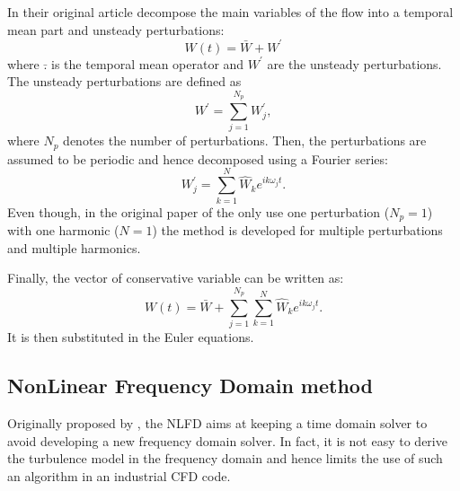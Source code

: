 In their original article \citet{He1998} decompose
the main variables of the flow into a temporal mean
part and unsteady perturbations:
\begin{equation}
	W(t) = \bar{W} + W^\prime
	\label{eq:nlh_decompose}
\end{equation}
where $\bar{.}$ is the temporal mean operator and
$W^\prime$ are the unsteady perturbations.
The unsteady perturbations are defined as
\begin{equation}
	W^\prime = \sum_{j=1}^{N_p} W^\prime_j,
	\label{eq:nlh_w_prime}
\end{equation}
where $N_p$ denotes the number of perturbations.
Then, the perturbations are assumed to be periodic and hence
decomposed using a Fourier series:
\begin{equation}
	W^\prime_j = \sum_{k=1}^{N} \widehat{W}_k e ^{i k \omega_j t}.
	\label{eq:nlh_fourier}
\end{equation}
Even though, in the original paper of \citet{He1998} the only use one 
perturbation ($N_p=1$) with one harmonic ($N=1$) the method
is developed for multiple perturbations and multiple harmonics.

Finally, the vector of conservative variable can be written as:
\begin{equation}
	W(t) = \bar{W} + \sum_{j=1}^{N_p} \sum_{k=1}^{N} \widehat{W}_k e ^{i k \omega_j t}.
\end{equation}
It is then substituted in the Euler equations.


\subsection{NonLinear Frequency Domain method} %
\label{sub:nonlinear_frequency_domain_method}

Originally proposed by \citet{McMullen2001}, the NLFD aims at
keeping a time domain solver to avoid developing a new
frequency domain solver. In fact, it is not easy to derive 
the turbulence model in the frequency domain and hence limits the
use of such an algorithm in an industrial CFD code.





